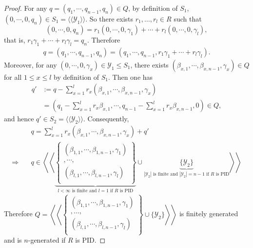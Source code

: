 \documentclass[11pt,openany]{book}
\theoremstyle{plain}
\theoremstyle{definition}
\theoremstyle{remark}
\begin{document}
\begin{proof}
    \medskip
    For any $q=(q_1,\cdots,q_{n-1},q_n)\in Q$, by definition of $S_1$, $(0,\cdots,0,q_n)\in S_1 = \langle \langle \mathcal{Y}_1 \rangle \rangle$. So there exists $r_1, \dots, r_l \in R$ such that$$(0,\cdots,0,q_n)=r_1(0,\cdots,0,\gamma_1)+\cdots+r_l(0,\cdots,0,\gamma_l),$$
    that is, $r_1 \gamma_1 + \cdots + r_l \gamma_l = q_n$. 
    Therefore
    \begin{align*}
        q =(q_1,\cdots,q_{n-1},q_n) =(q_1,\cdots,q_{n-1},r_1 \gamma_1 + \cdots + r_l \gamma_l).
    \end{align*}
    Moreover, for any $(0,\cdots,0,\gamma_x)\in\mathcal{Y}_1\leq S_1$, there exists $(\beta_{x,1},\cdots,\beta_{x,n-1},\gamma_x)\in Q$ for all $1\leq x\leq l$ by definition of $S_1$. Then one has
    \begin{align*}
        q'&:=q-\sum_{x=1}^{l}r_x(\beta_{x,1},\cdots,\beta_{x,n-1},\gamma_x)\\
        &=(q_1-\sum_{x=1}^{l}r_x\beta_{x,1},\cdots,q_{n-1}-\sum_{x=1}^{l}r_x\beta_{x,n-1},0)\in Q,
    \end{align*}
    and hence $q'\in S_2=\langle\langle\mathcal{Y}_2\rangle\rangle$. Consequently,
    \begin{align*}
        &\quad q=\sum_{x=1}^{l}r_x(\beta_{x,1},\cdots,\beta_{x,n-1},\gamma_x)+q'\\
        \Rightarrow &\quad q\in\left\langle\left\langle\underbrace{\left\{ 
        \begin{matrix}
            (\beta_{1,1},\cdots,\beta_{1,n-1},\gamma_1)\\
            ,\cdots,\\
            (\beta_{l,1},\cdots,\beta_{l,n-1},\gamma_l)\\
        \end{matrix}
    \right\}}_{l<\infty\text{ is finite and }l=1\text{ if $R$ is PID}}
    \cup\underbrace{\{\mathcal{Y}_2\}}_{|\mathcal{Y}_2|\text{ is finite and }|\mathcal{Y}_2|=n-1\text{ if $R$ is PID}}\right\rangle\right\rangle
    \end{align*}
    \medskip
    Therefore $Q=\left\langle\left\langle \left\{ 
    \begin{matrix}
        (\beta_{1,1},\cdots,\beta_{1,n-1},\gamma_1)\\
        ,\dots,\\
        (\beta_{l,1},\cdots,\beta_{l,n-1},\gamma_l)\\
    \end{matrix}
    \right\}\cup\{\mathcal{Y}_2\} \right\rangle\right\rangle$ is finitely generated and is $n$-generated if $R$ is PID.
\end{proof}
\end{document}
